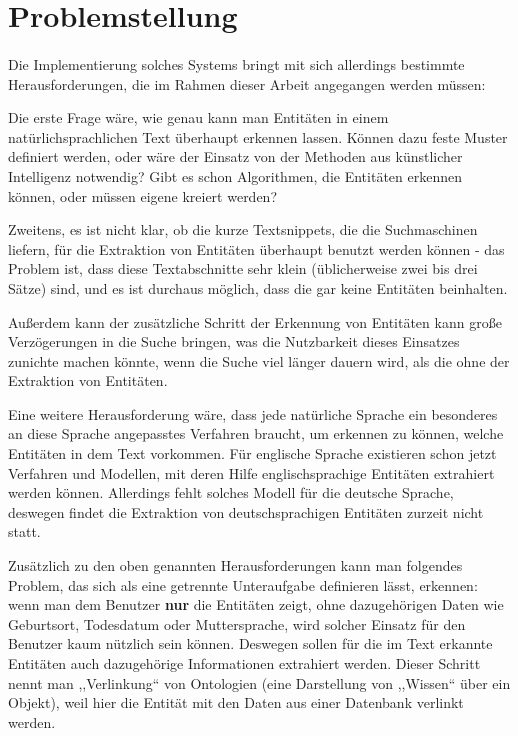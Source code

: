 \section{Problemstellung}
\label{sec:Problemstellung}
\paragraph{}
Die Implementierung solches Systems bringt mit sich allerdings bestimmte Herausforderungen, die im Rahmen dieser Arbeit angegangen werden müssen:

Die erste Frage wäre, wie genau kann man Entitäten in einem natürlichsprachlichen Text überhaupt erkennen lassen. Können dazu feste Muster definiert werden, oder wäre der Einsatz von der Methoden aus künstlicher Intelligenz notwendig? Gibt es schon Algorithmen, die Entitäten erkennen können, oder müssen eigene kreiert werden? 

Zweitens, es ist nicht klar, ob die kurze Textsnippets, die die Suchmaschinen liefern, für die Extraktion von Entitäten überhaupt benutzt werden können - das Problem ist, dass diese Textabschnitte sehr klein (üblicherweise zwei bis drei Sätze) sind, und es ist durchaus möglich, dass die gar keine Entitäten beinhalten.

Außerdem kann der zusätzliche Schritt der Erkennung von Entitäten kann große Verzögerungen in die Suche bringen, was die Nutzbarkeit dieses Einsatzes zunichte machen könnte, wenn die Suche viel länger dauern wird, als die ohne der Extraktion von Entitäten.

Eine weitere Herausforderung wäre, dass jede natürliche Sprache ein besonderes an diese Sprache angepasstes Verfahren braucht, um erkennen zu können, welche Entitäten in dem Text vorkommen. Für englische Sprache existieren schon jetzt Verfahren und Modellen, mit deren Hilfe englischsprachige Entitäten extrahiert werden können. Allerdings fehlt solches Modell für die deutsche Sprache, deswegen findet die Extraktion von deutschsprachigen Entitäten zurzeit nicht statt.

Zusätzlich zu den oben genannten Herausforderungen kann man folgendes Problem, das sich als eine getrennte Unteraufgabe definieren lässt, erkennen: wenn man dem Benutzer \textbf{nur} die Entitäten zeigt, ohne dazugehörigen Daten wie Geburtsort, Todesdatum oder Muttersprache, wird solcher Einsatz für den Benutzer kaum nützlich sein können. Deswegen sollen für die im Text erkannte Entitäten auch dazugehörige Informationen extrahiert werden. Dieser Schritt nennt man ,,Verlinkung`` von Ontologien (eine Darstellung von ,,Wissen`` über ein Objekt), weil hier die Entität mit den Daten aus einer Datenbank verlinkt werden.

